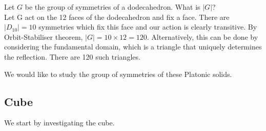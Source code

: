 \documentclass[../main.tex]{subfiles}
\begin{document}
\begin{example}
Let $G$ be the group of symmetries of a dodecahedron. What is $|G|$?\\
Let G act on the 12 faces of the dodecahedron and fix a face. There are $|D_{10}|=10$ symmetries which fix this face and our action is clearly transitive. By Orbit-Stabiliser theorem, $|G|=10\times12=120.$
Alternatively, this can be done by considering the fundamental domain, which is a triangle that uniquely determines the reflection. There are 120 such triangles.
\end{example}



We would like to study the group of symmetries of these Platonic solids.

\subsection{Cube}
We start by investigating the cube.
\end{document}
